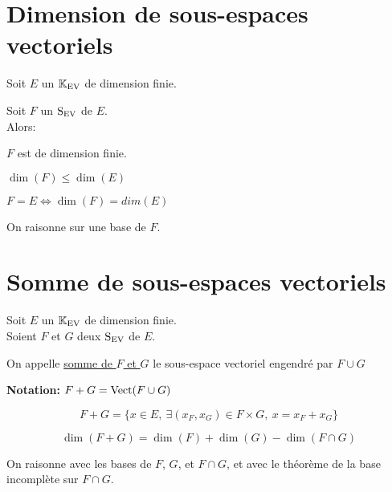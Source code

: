 \documentclass[12pt,twoside,a4paper]{article}
\author{MPSI 2}
\begin{document}
	\maketitle
	\section{Dimension de sous-espaces vectoriels}
		Soit $E$ un $\mathbb{K}_\mathrm{EV}$ de dimension finie.
		\begin{prop}
			Soit $F$ un $\mathrm{S}_\mathrm{EV}$ de $E$.\\
			Alors:
			\begin{liste}
				\item $F$ est de dimension finie.
				\item $\dim(F)\leqslant\dim(E)$
				\item $F=E\iff \dim(F)=dim(E)$
			\end{liste}
		\end{prop}
		\begin{preuve}
			On raisonne sur une base de $F$.
		\end{preuve}
	\section{Somme de sous-espaces vectoriels}
		Soit $E$ un $\mathbb{K}_\mathrm{EV}$ de dimension finie.\\
		Soient $F$ et $G$ deux $\mathrm{S}_\mathrm{EV}$ de $E$.
		\begin{defi}
			On appelle \underline{somme de $F$ et $G$} le sous-espace vectoriel engendr\'e par $F\cup G$
		\end{defi}
		\begin{flushleft}
			\textbf{Notation:} $F+G=\mathrm{Vect}(F\cup G)$
		\end{flushleft}
		\begin{prop}
			$$F+G=\{x\in E,\ \exists(x_F,x_G)\in F\times G,\ x=x_F+x_G \}$$
		\end{prop}
		\newpage
		\begin{prop}
			$$\dim(F+G)=\dim(F)+\dim(G)-\dim(F\cap G)$$
		\end{prop}
		\begin{preuve}
			On raisonne avec les bases de $F$, $G$, et $F\cap G$, et avec le th\'eor\`eme de la base incompl\`ete sur $F\cap G$.
		\end{preuve}
\end{document}

